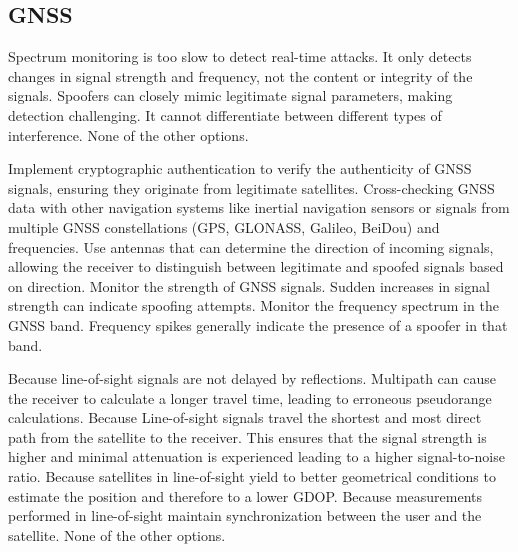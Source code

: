 \begin{questions}
    \section{GNSS}


    \begin{checkboxes}
        \choice Spectrum monitoring is too slow to detect real-time attacks.
        \CorrectChoice It only detects changes in signal strength and frequency, not the content or integrity of the signals.
        \CorrectChoice Spoofers can closely mimic legitimate signal parameters, making detection challenging.
        \choice It cannot differentiate between different types of interference.
        \choice None of the other options.
    \end{checkboxes}


    \begin{checkboxes}
        \choice Implement cryptographic authentication to verify the authenticity of GNSS signals, ensuring they originate from legitimate satellites.
        \choice Cross-checking GNSS data with other navigation systems like inertial navigation sensors or signals from multiple GNSS constellations (GPS, GLONASS, Galileo, BeiDou) and frequencies.
        \choice Use antennas that can determine the direction of incoming signals, allowing the receiver to distinguish between legitimate and spoofed signals based on direction.
        \choice Monitor the strength of GNSS signals. Sudden increases in signal strength can indicate spoofing attempts.
        \CorrectChoice Monitor the frequency spectrum in the GNSS band. Frequency spikes generally indicate the presence of a spoofer in that band.
    \end{checkboxes}


    \begin{checkboxes}
        \CorrectChoice Because line-of-sight signals are not delayed by reflections. Multipath can cause the receiver to calculate a longer travel time, leading to erroneous pseudorange calculations.
        \CorrectChoice Because Line-of-sight signals travel the shortest and most direct path from the satellite to the receiver. This ensures that the signal strength is higher and minimal attenuation is experienced leading to a higher signal-to-noise ratio.
        \choice Because satellites in line-of-sight yield to better geometrical conditions to estimate the position and therefore to a lower GDOP.
        \choice Because measurements performed in line-of-sight maintain synchronization between the user and the satellite.
        \choice None of the other options.
    \end{checkboxes}



\end{questions}
